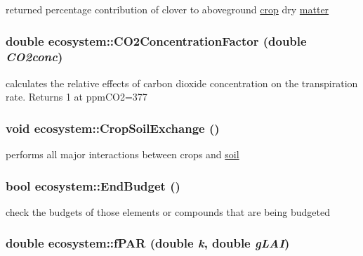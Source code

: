 returned percentage contribution of clover to aboveground \hyperlink{classcrop}{crop} dry \hyperlink{classmatter}{matter} \hypertarget{classecosystem_a546f8786d6c5965b960fd3de1988863e}{
\subsubsection[{CO2ConcentrationFactor}]{\setlength{\rightskip}{0pt plus 5cm}double ecosystem::CO2ConcentrationFactor (double {\em CO2conc})}}
\label{classecosystem_a546f8786d6c5965b960fd3de1988863e}


calculates the relative effects of carbon dioxide concentration on the transpiration rate. Returns 1 at ppmCO2=377 \hypertarget{classecosystem_a7d05455c8cb304e1a4207462f386bdc8}{
\subsubsection[{CropSoilExchange}]{\setlength{\rightskip}{0pt plus 5cm}void ecosystem::CropSoilExchange ()}}
\label{classecosystem_a7d05455c8cb304e1a4207462f386bdc8}


performs all major interactions between crops and \hyperlink{classsoil}{soil} \hypertarget{classecosystem_a9560c609a6cd01430c2ebb44a65a4358}{
\subsubsection[{EndBudget}]{\setlength{\rightskip}{0pt plus 5cm}bool ecosystem::EndBudget ()}}
\label{classecosystem_a9560c609a6cd01430c2ebb44a65a4358}


check the budgets of those elements or compounds that are being budgeted \hypertarget{classecosystem_a2176cebabe57a848605f4ecce56615e0}{
\subsubsection[{fPAR}]{\setlength{\rightskip}{0pt plus 5cm}double ecosystem::fPAR (double {\em k}, \/  double {\em gLAI})}}
\label{classecosystem_a2176cebabe57a848605f4ecce56615e0}


